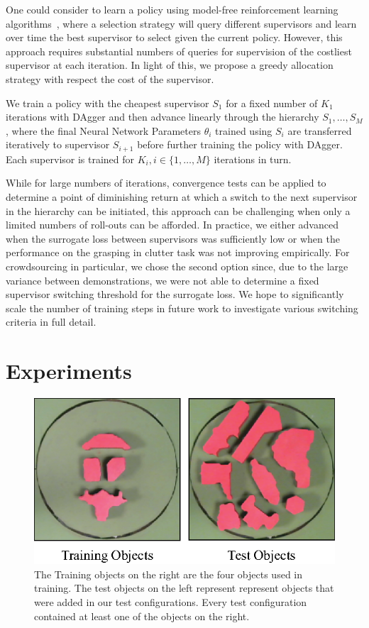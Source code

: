 \documentclass[10pt, conference]{ieeeconf}      %
\begin{document}
One could consider to learn a policy using model-free reinforcement learning algorithms~\cite{sutton1998reinforcement}, where a selection strategy will query different supervisors and learn over time the
best supervisor to select given the current policy. However, this approach requires substantial numbers of 
queries for supervision of the costliest supervisor at each iteration. In light of this, we propose a greedy allocation
strategy with respect the cost of the supervisor.

We train a policy with the cheapest supervisor $S_1$ for a fixed number of $K_1$ iterations with DAgger and then advance
linearly through the hierarchy $S_1, \ldots, S_M$, where the final Neural Network Parameters $\theta_i$ trained using
$S_i$ are transferred iteratively to supervisor $S_{i+1}$ before further training the policy with DAgger.
Each supervisor is trained for $K_i, i\in \{1, \ldots, M\}$ iterations in turn. 

While for large numbers of iterations, convergence tests can be applied to determine a point of diminishing return at
which a switch to the next supervisor in the hierarchy can be initiated, this approach can be challenging when only a
limited numbers of roll-outs can be afforded. In practice, we either advanced when the surrogate loss between
supervisors was sufficiently low or when the performance on the grasping in clutter task was not improving empirically. 
For crowdsourcing in particular, we chose the second option since, due to the large variance between demonstrations,
we were not able to determine a fixed supervisor switching threshold for the surrogate loss. We hope to significantly scale the number of
training steps in future work to investigate various switching criteria in full detail.

\section{Experiments} \label{sec:Exp}


\begin{figure}[t]
\centering
\includegraphics{f_figs/shapes_set.eps}

\caption{\footnotesize  The Training objects on the right are the four objects used in training. The test objects on the
left represent represent objects that were added in our test configurations. Every test configuration contained at least
one of the objects on the right.}

\label{fig:shape_set}
\end{figure}
\end{document}
